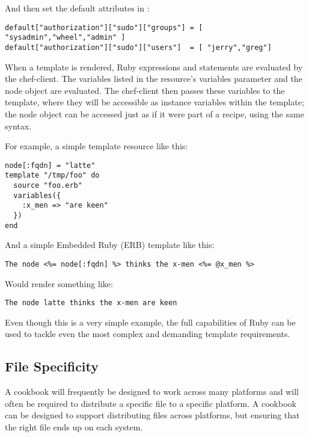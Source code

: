 And then set the default attributes in :

\begin{lstlisting}[label=lst:cookbook-templates3]
default["authorization"]["sudo"]["groups"] = [ "sysadmin","wheel","admin" ]
default["authorization"]["sudo"]["users"]  = [ "jerry","greg"]
\end{lstlisting}

When a template is rendered, Ruby expressions and statements are evaluated by the chef-client. The variables listed in the resource’s variables parameter and the node object are evaluated. The chef-client then passes these variables to the template, where they will be accessible as instance variables within the template; the node object can be accessed just as if it were part of a recipe, using the same syntax.

For example, a simple template resource like this:

\begin{lstlisting}[label=lst:cookbook-templates4]
node[:fqdn] = "latte"
template "/tmp/foo" do
  source "foo.erb"
  variables({
    :x_men => "are keen"
  })
end
\end{lstlisting}

And a simple Embedded Ruby (ERB) template like this:

\begin{lstlisting}[label=lst:cookbook-templates5]
The node <%= node[:fqdn] %> thinks the x-men <%= @x_men %>
\end{lstlisting}

Would render something like:

\begin{lstlisting}[label=lst:cookbook-templates6]
The node latte thinks the x-men are keen
\end{lstlisting}

Even though this is a very simple example, the full capabilities of Ruby can be used to tackle even the most complex and demanding template requirements.

\subsection{File Specificity}

A cookbook will frequently be designed to work across many platforms and will often be required to distribute a specific file to a specific platform. A cookbook can be designed to support distributing files across platforms, but ensuring that the right file ends up on each system.

